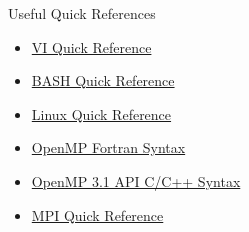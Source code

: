 \documentclass[final,t]{beamer}
\begin{document}
\begin{frame}[fragile]{}
\begin{columns}[t]
\begin{column}{.32\linewidth}
      \begin{block}{Useful Quick References}
        \vspace*{-3ex}
        \begin{multicols}{2}
        \begin{itemize}
        \item \href{https://wiki.auckland.ac.nz/download/attachments/37950883/vi+Quick+Reference.pdf}{VI Quick Reference}
        \item \href{https://wiki.auckland.ac.nz/download/attachments/37950883/Bash+Quick+Reference.pdf}{BASH Quick Reference} 
        \item \href{https://wiki.auckland.ac.nz}{Linux Quick Reference}
        \item \href{https://wiki.auckland.ac.nz/download/attachments/37950883/OpenMP3.1-FortranCard.pdf}{OpenMP Fortran Syntax}
        \item \href{https://wiki.auckland.ac.nz/download/attachments/37950883/OpenMP3.1-CCard.pdf}{OpenMP 3.1 API C/C++ Syntax}
        \item \href{https://wiki.auckland.ac.nz}{MPI Quick Reference}
        \end{itemize}
        \end{multicols}
        \vspace*{-3ex}
      \end{block}


\end{column}
\end{columns}
\end{frame}
\end{document}
